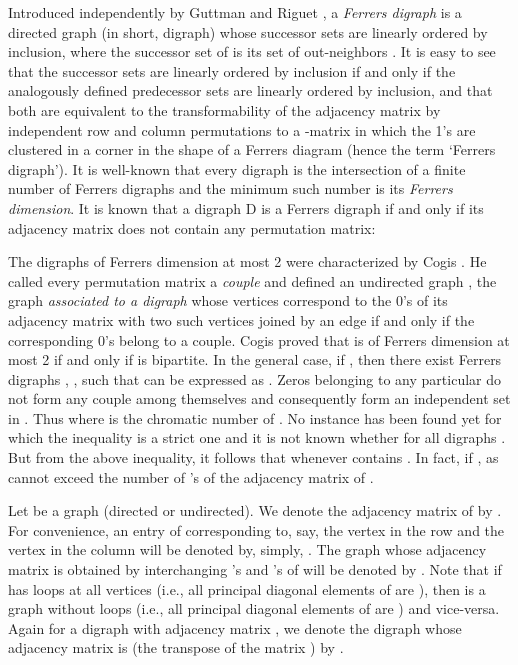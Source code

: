 \documentclass[11pt]{article}
\theoremstyle{definition}
\theoremstyle{remark}
\numberwithin{equation}{section}
\begin{document}
\vspace{1 em} Introduced independently by Guttman \cite{G} and Riguet \cite{R}, a {\em Ferrers digraph}  is a directed graph (in short, digraph) whose successor sets are linearly ordered by inclusion, where the successor set of  is its set of out-neighbors . It is easy to see that the successor sets are linearly ordered by inclusion if and only if the analogously defined predecessor sets are linearly ordered by inclusion, and that both are equivalent to the transformability of the adjacency matrix by independent row and column permutations to a -matrix in which the 1's are clustered in a corner in the shape of a Ferrers diagram (hence the term `Ferrers digraph'). It is well-known that every digraph  is the intersection of a finite number of Ferrers digraphs and the minimum such number is its {\em Ferrers dimension}. It is known \cite{R} that a digraph D is a Ferrers digraph if and only if its adjacency matrix does not contain any  permutation matrix:

The digraphs of Ferrers dimension at most 2 were characterized by Cogis \cite{C}. He called every  permutation matrix a {\em couple} and defined an undirected graph , the graph {\em associated to a digraph}  whose vertices correspond to the 0's of its adjacency matrix with two such vertices joined by an edge if and only if the corresponding 0's belong to a couple. Cogis \cite{C} proved that  is of Ferrers dimension at most 2 if and only if  is bipartite. In the general case, if , then there exist Ferrers digraphs , , such that  can be expressed as . Zeros belonging to any particular  do not form any couple among themselves and consequently form an independent set in . Thus  where  is the chromatic number of . No instance has been found yet for which the inequality is a strict one and it is not known whether  for all digraphs . But from the above inequality, it follows that  whenever  contains . In fact,  if , as  cannot exceed the number of 's of the adjacency matrix of .

\vspace{1em} Let  be a graph (directed or undirected). We denote the adjacency matrix of  by . For convenience, an entry of  corresponding to, say, the vertex  in the row and the vertex  in the column will be denoted by, simply, . The graph whose adjacency matrix is obtained by interchanging 's and 's of  will be denoted by . Note that if  has loops at all vertices (i.e., all principal diagonal elements of  are ), then  is a graph without loops (i.e., all principal diagonal elements of  are ) and vice-versa. Again for a digraph  with adjacency matrix , we denote the digraph whose adjacency matrix is  (the transpose of the matrix ) by .
\end{document}
